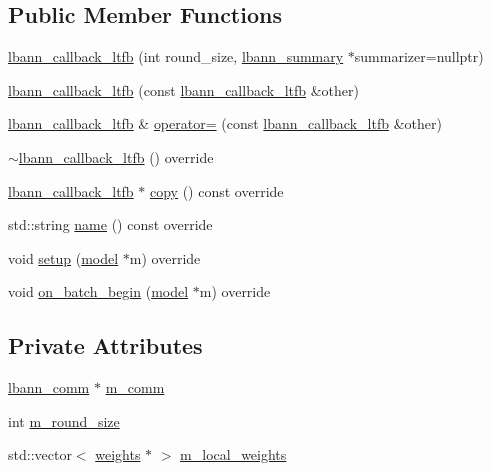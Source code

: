 \subsection*{Public Member Functions}
\begin{DoxyCompactItemize}
\item 
\hyperlink{classlbann_1_1lbann__callback__ltfb_a44cb8fdfa7aae5d35543e47f3105f8cb}{lbann\+\_\+callback\+\_\+ltfb} (int round\+\_\+size, \hyperlink{classlbann_1_1lbann__summary}{lbann\+\_\+summary} $\ast$summarizer=nullptr)
\item 
\hyperlink{classlbann_1_1lbann__callback__ltfb_af589490a67c5490ac91210c89ab66295}{lbann\+\_\+callback\+\_\+ltfb} (const \hyperlink{classlbann_1_1lbann__callback__ltfb}{lbann\+\_\+callback\+\_\+ltfb} \&other)
\item 
\hyperlink{classlbann_1_1lbann__callback__ltfb}{lbann\+\_\+callback\+\_\+ltfb} \& \hyperlink{classlbann_1_1lbann__callback__ltfb_a19467cc32f7a1960ec6d62ca1c0cb6b8}{operator=} (const \hyperlink{classlbann_1_1lbann__callback__ltfb}{lbann\+\_\+callback\+\_\+ltfb} \&other)
\item 
\hyperlink{classlbann_1_1lbann__callback__ltfb_abfb61fe2c92147dff98f861adb2d5c74}{$\sim$lbann\+\_\+callback\+\_\+ltfb} () override
\item 
\hyperlink{classlbann_1_1lbann__callback__ltfb}{lbann\+\_\+callback\+\_\+ltfb} $\ast$ \hyperlink{classlbann_1_1lbann__callback__ltfb_a62daf57a8c34fd301e24ba4fa2dd6630}{copy} () const override
\item 
std\+::string \hyperlink{classlbann_1_1lbann__callback__ltfb_aaf259b187e956282807d4daa03beb502}{name} () const override
\item 
void \hyperlink{classlbann_1_1lbann__callback__ltfb_a7548166d170eda00e4e0cba6626a1a78}{setup} (\hyperlink{classlbann_1_1model}{model} $\ast$m) override
\item 
void \hyperlink{classlbann_1_1lbann__callback__ltfb_a7d2d1682c4a6a6b7e8ea1e3f4bf33c84}{on\+\_\+batch\+\_\+begin} (\hyperlink{classlbann_1_1model}{model} $\ast$m) override
\end{DoxyCompactItemize}
\subsection*{Private Attributes}
\begin{DoxyCompactItemize}
\item 
\hyperlink{classlbann_1_1lbann__comm}{lbann\+\_\+comm} $\ast$ \hyperlink{classlbann_1_1lbann__callback__ltfb_a7536bb519c8a89b518a3196f953ac048}{m\+\_\+comm}
\item 
int \hyperlink{classlbann_1_1lbann__callback__ltfb_a78434b8e8b1dfa43a68a9707473cf789}{m\+\_\+round\+\_\+size}
\item 
std\+::vector$<$ \hyperlink{classlbann_1_1weights}{weights} $\ast$ $>$ \hyperlink{classlbann_1_1lbann__callback__ltfb_a5e5b9917b9eee67b8e14c6e8f95a85a3}{m\+\_\+local\+\_\+weights}
\end{DoxyCompactItemize}
